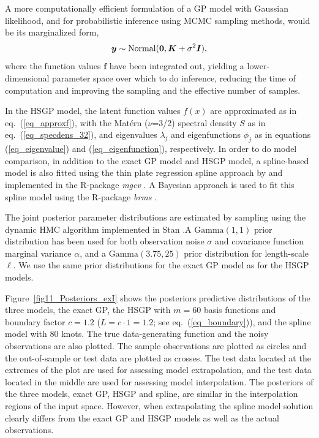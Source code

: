 A more computationally efficient formulation of a GP model with Gaussian likelihood, and for probabilistic inference using MCMC sampling methods, would be its marginalized form,
%
\begin{equation*}\label{eq_marginalizedgp_simudata1}
\bm{y} \sim \operatorname{Normal}(\bm{0},\bm{K}+ \sigma^2 \bm{I} ),
\end{equation*}
%
where the function values $\bm{f}$ have been integrated out, yielding a lower-dimensional parameter space over which to do inference, reducing the time of computation and improving the sampling and the effective number of samples.

In the HSGP model, the latent function values $f(x)$ are approximated as in eq.~(\ref{eq_approxf}), with the Mat{\'e}rn ($\nu$=3/2) spectral density $S$ as in eq.~(\ref{eq_specdens_32}), and eigenvalues $\lambda_j$ and eigenfunctions $\phi_j$ as in equations (\ref{eq_eigenvalue}) and (\ref{eq_eigenfunction}), respectively.  In order to do model comparison, in addition to the exact GP model and HSGP model, a spline-based model is also fitted using the thin plate regression spline approach by \citet{wood2003thin} and implemented in the R-package \textit{mgcv} \citep{wood2011mgcv}. A Bayesian approach is used to fit this spline model using the R-package \textit{brms} \citep{burkner2017brms}.

The joint posterior parameter distributions are estimated by sampling using the dynamic HMC algorithm implemented in Stan \citep{carpenter2017stan,betancourt2017conceptual}.\break A $\mathrm{Gamma}(1,1)$ prior distribution has been used for both observation noise $\sigma$ and covariance function marginal variance $\alpha$, and a $\mathrm{Gamma}(3.75,25)$ prior distribution for length-scale $\ell$. We use the same prior distributions for the exact GP model as for the HSGP models.

Figure~\ref{fig11_Posteriors_exI} shows the posteriors predictive distributions of the three models, the exact GP, the HSGP with $m=60$ basis functions and boundary factor $c=1.2$ ($L=c\cdot 1= 1.2$; see eq.~(\ref{eq_boundary})), and the spline model with 80 knots. The true data-generating function and the noisy observations are also plotted. The sample observations are plotted as circles and the out-of-sample or test data are plotted as crosses. The test data located at the extremes of the plot are used for assessing model extrapolation, and the test data located in the middle are used for assessing model interpolation. The posteriors of the three models, exact GP, HSGP and spline, are similar in the interpolation regions of the input space. However, when extrapolating the spline model solution clearly differs from the exact GP and HSGP models as well as the actual observations. 

